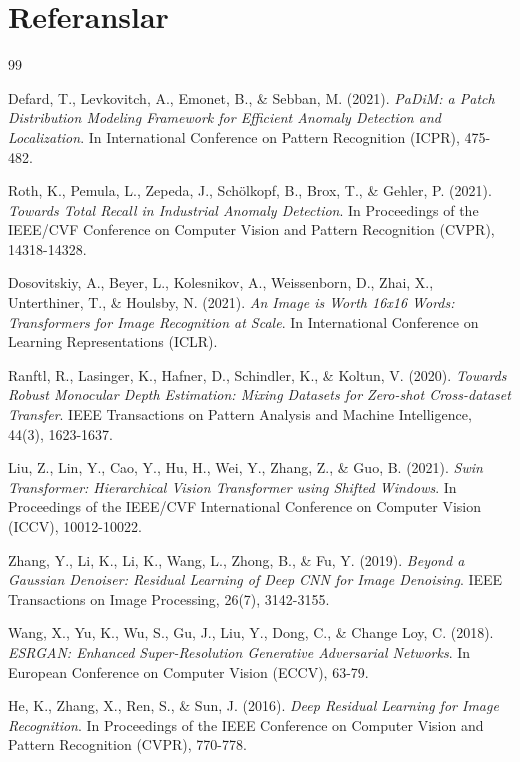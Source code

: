 \documentclass[12pt]{article}
\begin{document}
\section{Referanslar}
\begin{thebibliography}{99}

Defard, T., Levkovitch, A., Emonet, B., \& Sebban, M. (2021).
\textit{PaDiM: a Patch Distribution Modeling Framework for Efficient Anomaly Detection and Localization}.
In International Conference on Pattern Recognition (ICPR), 475-482.

Roth, K., Pemula, L., Zepeda, J., Schölkopf, B., Brox, T., \& Gehler, P. (2021).
\textit{Towards Total Recall in Industrial Anomaly Detection}.
In Proceedings of the IEEE/CVF Conference on Computer Vision and Pattern Recognition (CVPR), 14318-14328.

Dosovitskiy, A., Beyer, L., Kolesnikov, A., Weissenborn, D., Zhai, X., Unterthiner, T., \& Houlsby, N. (2021).
\textit{An Image is Worth 16x16 Words: Transformers for Image Recognition at Scale}.
In International Conference on Learning Representations (ICLR).

Ranftl, R., Lasinger, K., Hafner, D., Schindler, K., \& Koltun, V. (2020).
\textit{Towards Robust Monocular Depth Estimation: Mixing Datasets for Zero-shot Cross-dataset Transfer}.
IEEE Transactions on Pattern Analysis and Machine Intelligence, 44(3), 1623-1637.

Liu, Z., Lin, Y., Cao, Y., Hu, H., Wei, Y., Zhang, Z., \& Guo, B. (2021).
\textit{Swin Transformer: Hierarchical Vision Transformer using Shifted Windows}.
In Proceedings of the IEEE/CVF International Conference on Computer Vision (ICCV), 10012-10022.

Zhang, Y., Li, K., Li, K., Wang, L., Zhong, B., \& Fu, Y. (2019).
\textit{Beyond a Gaussian Denoiser: Residual Learning of Deep CNN for Image Denoising}.
IEEE Transactions on Image Processing, 26(7), 3142-3155.

Wang, X., Yu, K., Wu, S., Gu, J., Liu, Y., Dong, C., \& Change Loy, C. (2018).
\textit{ESRGAN: Enhanced Super-Resolution Generative Adversarial Networks}.
In European Conference on Computer Vision (ECCV), 63-79.

He, K., Zhang, X., Ren, S., \& Sun, J. (2016).
\textit{Deep Residual Learning for Image Recognition}.
In Proceedings of the IEEE Conference on Computer Vision and Pattern Recognition (CVPR), 770-778.


\end{thebibliography}
\end{document}
